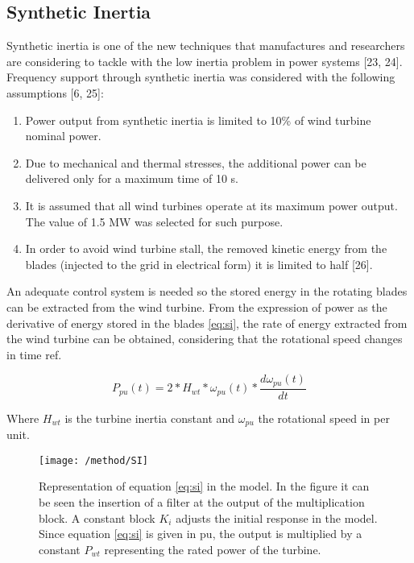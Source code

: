 \subsection{Synthetic Inertia}


Synthetic inertia is one of the new techniques that manufactures and researchers are considering to tackle with the low inertia problem in power systems  [23, 24]. Frequency support through synthetic inertia was considered with the following assumptions [6, 25]:
\begin{enumerate}[leftmargin=*,labelsep=4.9mm]
	\item Power output from synthetic inertia is limited to 10\% of wind turbine nominal power.
	\item Due to mechanical and thermal stresses, the additional power can be delivered only for a maximum time of 10 s.
	\item It is assumed that all wind turbines operate at its maximum power output. The value of 1.5 MW was selected for such purpose.
	\item In order to avoid wind turbine stall, the removed kinetic energy from the blades (injected to the grid in electrical form) it is limited to half [26].

\end{enumerate}

	An adequate control system is needed so the stored energy in the rotating blades can be extracted from the wind turbine. From the expression of power as the derivative of energy stored in the blades \eqref{eq:si}, the rate of energy extracted from the wind turbine can be obtained, considering that the rotational speed changes in time ref.

\begin{equation}
	\label{eq:si}
	P_{pu}(t)=2*H_{wt}*\omega_{pu}(t)*\dfrac{d\omega_{pu}(t)}{dt}
\end{equation}


Where  $H_{wt}$ is the turbine inertia constant and $\omega_{pu}$ the rotational speed in per unit.\\

\begin{figure}[h]
	\centering
	\texttt{[image: /method/SI]}
	\caption{Representation of equation \eqref{eq:si} in the model. In the figure it can be seen the insertion of a filter at the output of the multiplication block. A constant block $ K_i $ adjusts the initial response in the model. Since equation \eqref{eq:si} is given in pu, the output is multiplied by a constant $ P_{wt} $ representing the rated power of the turbine.}
	\label{fig:synthetic}
\end{figure}





